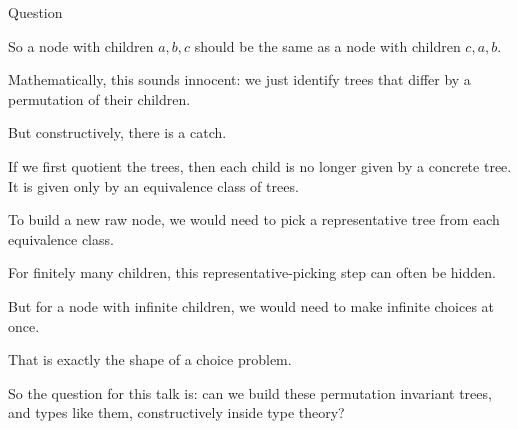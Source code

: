 \documentclass{beamer}
\begin{document}
\begin{frame}{Question}
{    So a node with children \(a,b,c\) should be the same as a node with
    children \(c,a,b\).

    Mathematically, this sounds innocent: we just identify trees that
    differ by a permutation of their children.

    But constructively, there is a catch.

    If we first quotient the trees, then each child is no longer given by
    a concrete tree. It is given only by an equivalence class of trees.

    To build a new raw node, we would need to pick a representative tree
    from each equivalence class.

    For finitely many children, this representative-picking step can often
    be hidden.

    But for a node with infinite children, we would need to make
    infinite choices at once.

    That is exactly the shape of a choice problem.

    So the question for this talk is: can we build these permutation
    invariant trees, and types like them, constructively inside type theory?
  }
\end{frame}
\end{document}
